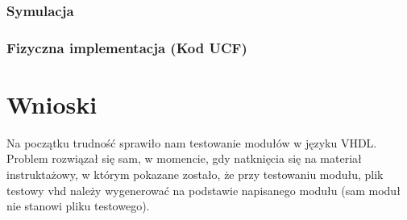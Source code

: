 \documentclass[a4paper,12pt]{extarticle}  %
\begin{document}
\subsubsection{Symulacja}
\begin{figure}[H]
   \centering
\end{figure}
\subsubsection{Fizyczna implementacja (Kod UCF)}


\section{Wnioski}

Na początku trudność sprawiło nam testowanie modułów w języku VHDL. Problem rozwiązał się sam, w momencie, gdy natknięcia się na materiał instruktażowy, w którym pokazane zostało, że przy testowaniu modułu, plik testowy vhd należy wygenerować na podstawie napisanego modułu (sam moduł nie stanowi pliku testowego).
\end{document}
